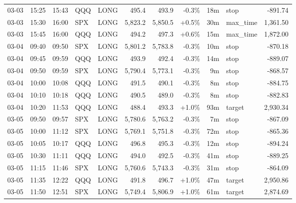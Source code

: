 \documentclass[11pt,a4paper,twoside]{article}
\begin{document}
\begin{center}
\begin{longtable}{>{\color{txtmain}}l l l l l r r r r >{\color{txtmain}}l r}
03-03 & 15:25 & 15:43 & QQQ & LONG & 495.4 & 493.9 & \textcolor{lossred}{-0.3\%} & 18m & stop & \textcolor{lossred}{-891.74} \\
03-03 & 15:30 & 16:00 & SPX & LONG & 5,823.2 & 5,850.5 & \textcolor{wingreen}{+0.5\%} & 30m & max\_time & \textcolor{wingreen}{1,361.50} \\
03-03 & 15:45 & 16:00 & QQQ & LONG & 494.2 & 497.3 & \textcolor{wingreen}{+0.6\%} & 15m & max\_time & \textcolor{wingreen}{1,872.00} \\
03-04 & 09:40 & 09:50 & SPX & LONG & 5,801.2 & 5,783.8 & \textcolor{lossred}{-0.3\%} & 10m & stop & \textcolor{lossred}{-870.18} \\
03-04 & 09:45 & 09:59 & QQQ & LONG & 493.9 & 492.4 & \textcolor{lossred}{-0.3\%} & 14m & stop & \textcolor{lossred}{-889.07} \\
03-04 & 09:50 & 09:59 & SPX & LONG & 5,790.4 & 5,773.1 & \textcolor{lossred}{-0.3\%} & 9m & stop & \textcolor{lossred}{-868.57} \\
03-04 & 10:00 & 10:08 & QQQ & LONG & 491.5 & 490.1 & \textcolor{lossred}{-0.3\%} & 8m & stop & \textcolor{lossred}{-884.75} \\
03-04 & 10:10 & 10:18 & QQQ & LONG & 490.5 & 489.0 & \textcolor{lossred}{-0.3\%} & 8m & stop & \textcolor{lossred}{-882.83} \\
03-04 & 10:20 & 11:53 & QQQ & LONG & 488.4 & 493.3 & \textcolor{wingreen}{+1.0\%} & 93m & target & \textcolor{wingreen}{2,930.34} \\
03-05 & 09:50 & 09:57 & SPX & LONG & 5,780.6 & 5,763.2 & \textcolor{lossred}{-0.3\%} & 7m & stop & \textcolor{lossred}{-867.09} \\
03-05 & 10:00 & 11:12 & SPX & LONG & 5,769.1 & 5,751.8 & \textcolor{lossred}{-0.3\%} & 72m & stop & \textcolor{lossred}{-865.36} \\
03-05 & 10:05 & 10:17 & QQQ & LONG & 496.8 & 495.3 & \textcolor{lossred}{-0.3\%} & 12m & stop & \textcolor{lossred}{-894.24} \\
03-05 & 10:30 & 11:11 & QQQ & LONG & 494.0 & 492.5 & \textcolor{lossred}{-0.3\%} & 41m & stop & \textcolor{lossred}{-889.25} \\
03-05 & 11:15 & 11:46 & SPX & LONG & 5,760.6 & 5,743.3 & \textcolor{lossred}{-0.3\%} & 31m & stop & \textcolor{lossred}{-864.09} \\
03-05 & 11:35 & 12:22 & QQQ & LONG & 491.8 & 496.7 & \textcolor{wingreen}{+1.0\%} & 47m & target & \textcolor{wingreen}{2,950.86} \\
03-05 & 11:50 & 12:51 & SPX & LONG & 5,749.4 & 5,806.9 & \textcolor{wingreen}{+1.0\%} & 61m & target & \textcolor{wingreen}{2,874.69} \\

\end{longtable}
\end{center}
\end{document}
